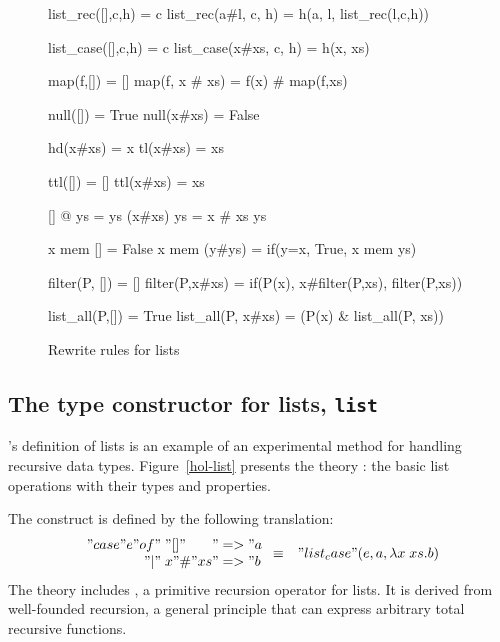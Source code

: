 \begin{figure}
\begin{ttbox}\makeatother
{}    list_rec([],c,h) = c  
   list_rec(a#l, c, h) = h(a, l, list_rec(l,c,h))

   list_case([],c,h) = c 
  list_case(x#xs, c, h) = h(x, xs)

         map(f,[]) = []
        map(f, x \# xs) = f(x) \# map(f,xs)

        null([]) = True
       null(x#xs) = False

         hd(x#xs) = x
         tl(x#xs) = xs

         ttl([]) = []
        ttl(x#xs) = xs

      [] @ ys = ys
     (x#xs) \at ys = x # xs \at ys

         x mem [] = False
        x mem (y#ys) = if(y=x, True, x mem ys)

      filter(P, []) = []
     filter(P,x#xs) = if(P(x), x#filter(P,xs), filter(P,xs))

    list_all(P,[]) = True
   list_all(P, x#xs) = (P(x) & list_all(P, xs))
\end{ttbox}
\caption{Rewrite rules for lists} \label{hol-list-simps}
\end{figure}


\subsection{The type constructor for lists, {\tt list}}

\HOL's definition of lists is an example of an experimental method for
handling recursive data types.  Figure~\ref{hol-list} presents the theory
: the basic list operations with their types and properties.

The  construct is defined by the following translation:
{\dquotes
\begin{eqnarray*}
  \begin{array}{r@{\;}l@{}l}
  "case " e " of" & "[]"    & " => " a\\
              "|" & x"\#"xs & " => " b
  \end{array} 
  & \equiv &
  "list_case"(e, a, \lambda x\;xs.b)
\end{eqnarray*}}%
The theory includes , a primitive recursion operator
for lists.  It is derived from well-founded recursion, a general principle
that can express arbitrary total recursive functions.

